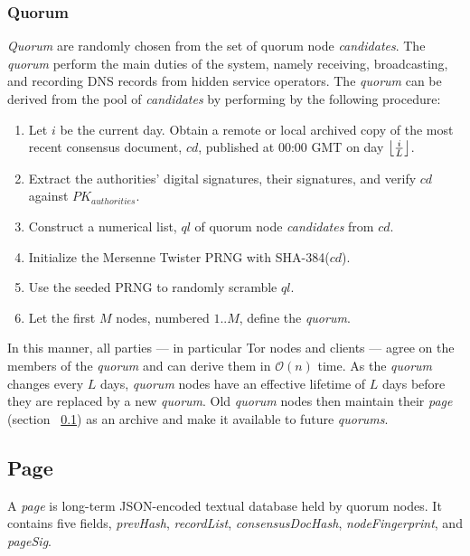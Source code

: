 \subsubsection{Quorum}

\emph{Quorum} are randomly chosen from the set of quorum node \emph{candidates}. The \emph{quorum} perform the main duties of the system, namely receiving, broadcasting, and recording DNS records from hidden service operators. The \emph{quorum} can be derived from the pool of \emph{candidates} by performing by the following procedure:

\begin{enumerate}
	\item Let $ i $ be the current day. Obtain a remote or local archived copy of the most recent consensus document, $ cd $, published at 00:00 GMT on day $ \floor[\big]{\frac{i}{L}} $.
	\item Extract the authorities' digital signatures, their signatures, and verify $ cd $ against $ PK_{authorities} $.
	\item Construct a numerical list, $ ql $ of quorum node \emph{candidates} from $ cd $.
	\item Initialize the Mersenne Twister PRNG with SHA-384($ cd $).
	\item Use the seeded PRNG to randomly scramble $ ql $.
	\item Let the first $ M $ nodes, numbered $ 1 .. M $, define the \emph{quorum}.
\end{enumerate}

In this manner, all parties --- in particular Tor nodes and clients --- agree on the members of the \emph{quorum} and can derive them in $ \mathcal{O}(n) $ time. As the \emph{quorum} changes every $ L $ days, \emph{quorum} nodes have an effective lifetime of $ L $ days before they are replaced by a new \emph{quorum}. Old \emph{quorum} nodes then maintain their \emph{page} (section ~\ref{sec:Page}) as an archive and make it available to future \emph{quorums}.

\subsection{Page}
\label{sec:Page}

A \emph{page} is long-term JSON-encoded textual database held by quorum nodes. It contains five fields, \emph{prevHash}, \emph{recordList}, \emph{consensusDocHash}, \emph{nodeFingerprint}, and \emph{pageSig}. 

